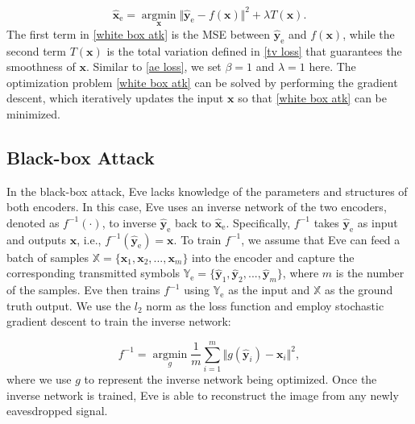 \documentclass[conference]{IEEEtran}
\begin{document}
\begin{equation}
\hat{\boldsymbol{x}}_\mathrm{e} = \mathop{\arg\min}\limits_{\boldsymbol{x}} \Vert   \hat{\boldsymbol{y}}_\mathrm{e} - f(\boldsymbol{x}) \Vert ^2 + \lambda T(\boldsymbol{x}).
\label{white box atk}	
\end{equation}
The first term in \eqref{white box atk} is the MSE between $\hat{\boldsymbol{y}}_\mathrm{e}$ and $f(\boldsymbol{x})$, while the second term $T(\boldsymbol{x})$ is the total variation defined in \eqref{tv loss} that guarantees the smoothness of $\boldsymbol{x}$. Similar to \eqref{ae loss}, we set $\beta = 1$ and $\lambda = 1$ here. The optimization problem \eqref{white box atk} can be solved by performing the gradient descent, which iteratively updates the input $\boldsymbol{x}$ so that \eqref{white box atk} can be minimized.

\subsection{Black-box Attack}
\label{sec bb-mia}
In the black-box attack, Eve lacks knowledge of the parameters and structures of both encoders. In this case, Eve uses an inverse network of the two encoders, denoted as $f^{-1}(\cdot)$, to inverse $\hat{\boldsymbol{y}}_\mathrm{e}$ back to $\hat{\boldsymbol{x}}_\mathrm{e}$. Specifically, $f^{-1}$ takes $\hat{\boldsymbol{y}}_\mathrm{e}$ as input and outputs $\boldsymbol{x}$, i.e., $f^{-1}(\hat{\boldsymbol{y}}_\mathrm{e}) = \boldsymbol{x}$. To train $f^{-1}$, we assume that Eve can feed a batch of samples $\mathbb{X} = \{\boldsymbol{x}_1, \boldsymbol{x}_2, ..., \boldsymbol{x}_m\}$ into the encoder and capture the corresponding transmitted symbols $\mathbb{Y}_\mathrm{e} = \{\hat{\boldsymbol{y}}_{1}, \hat{\boldsymbol{y}}_2, ..., \hat{\boldsymbol{y}}_m\}$, where $m$ is the number of the samples. Eve then trains $f^{-1}$ using $\mathbb{Y}_\mathrm{e}$ as the input and $\mathbb{X}$ as the ground truth output. We use the $l_2$ norm as the loss function and employ stochastic gradient descent to train the inverse network:

\begin{equation}
f^{-1} = \mathop{\arg\min}\limits_{g}\frac{1}{m}\sum\limits_{i=1}^m \Vert g(\hat{\boldsymbol{y}}_i) - \boldsymbol{x}_i \Vert^2 ,
\label{black box atk}	
\end{equation}
where we use $g$ to represent the inverse network being optimized. Once the inverse network is trained, Eve is able to reconstruct the image from any newly eavesdropped signal.
\end{document}
